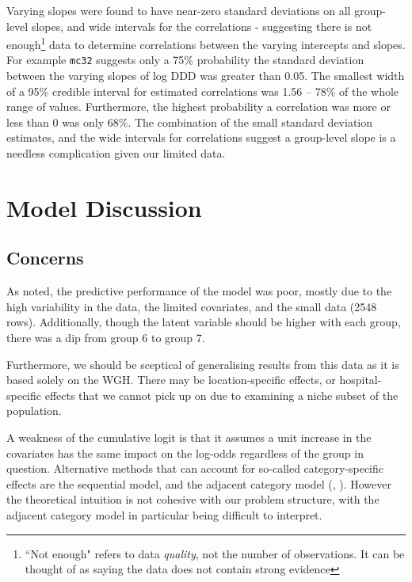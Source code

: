 \documentclass[11pt,twoside]{article}
\numberwithin{Theorem}{section}
\numberwithin{Definition}{section}
\numberwithin{Lemma}{section}
\numberwithin{Algorithm}{section}
\numberwithin{equation}{section}
\begin{document}
\vspace*{3mm}

Varying slopes were found to have near-zero standard deviations on all group-level slopes, and wide intervals for the correlations - suggesting there is not enough\footnote{``Not enough" refers to data \textit{quality}, not the number of observations. It can be thought of as saying the data does not contain strong evidence} data to determine correlations between the varying intercepts and slopes. For example \texttt{mc32} suggests only a 75\% probability the standard deviation between the varying slopes of log DDD was greater than 0.05. The smallest width of a 95\% credible interval for estimated correlations was 1.56 -- 78\% of the whole range of values. Furthermore, the highest probability a correlation was more or less than 0 was only 68\%. The combination of the small standard deviation estimates, and the wide intervals for correlations suggest a group-level slope is a needless complication given our limited data. 

\newpage
\section{Model Discussion} \label{sec::Discussion}

\subsection{Concerns}

As noted, the predictive performance of the model was poor, mostly due to the high variability in the data, the limited covariates, and the small data (2548 rows). Additionally, though the latent variable should be higher with each group, there was a dip from group 6 to group 7. 

Furthermore, we should be sceptical of generalising results from this data as it is based solely on the WGH. There may be location-specific effects, or hospital-specific effects that we cannot pick up on due to examining a niche subset of the population. 

A weakness of the cumulative logit is that it assumes a unit increase in the covariates has the same impact on the log-odds regardless of the group in question. Alternative methods that can account for so-called category-specific effects are the sequential model, and the adjacent category model (\citeauthor{BurknerVuorre2018}, \citeyear{BurknerVuorre2018}). However the theoretical intuition is not cohesive with our problem structure, with the adjacent category model in particular being difficult to interpret. 
\end{document}
